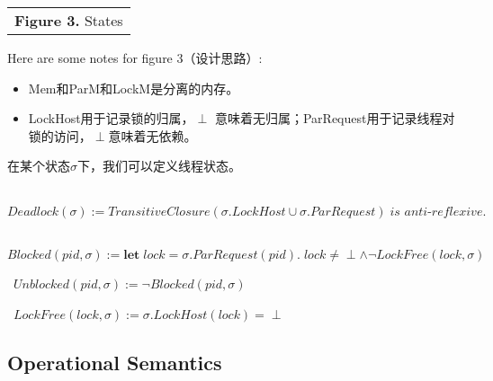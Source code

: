 \documentclass[UTF8, 8pt, a4paper ]{ctexart}
\begin{document}
\begin{small}
\begin{longtable}{rcl}
			\hline
			
			\multicolumn{3}{c}{\textbf{Figure 3.} States} 
		\end{longtable}

		Here are some notes for {figure 3}（设计思路）:
		\begin{itemize}
			\item Mem和ParM和LockM是分离的内存。
			\item LockHost用于记录锁的归属，$\perp$ 意味着无归属；ParRequest用于记录线程对锁的访问，$\perp$意味着无依赖。
		\end{itemize}
	

		在某个状态$\sigma$下，我们可以定义线程状态。

		\begin{definition}\ $Deadlock(\sigma):= TransitiveClosure(\sigma.LockHost \cup \sigma.ParRequest)\;\textit{is anti-reflexive}.$	
		\end{definition}

		\begin{definition}\ $Blocked(pid, \sigma):= \textbf{let}\;lock=\sigma.ParRequest(pid).\;lock \not= \perp \wedge \neg LockFree(lock, \sigma)$				
		\end{definition}


		\begin{definition}\ $Unblocked(pid, \sigma):= \neg Blocked(pid, \sigma)$	
			
		\end{definition}

			

		\begin{definition}\ $LockFree(lock, \sigma):= \sigma.LockHost(lock) = \perp$	
			
		\end{definition}


	\kspace
	
	\subsection{Operational Semantics}
	
	
	
	
	\begin{comment}
	$ \textsf{stop-faultyClt}(\sigma, t) \ \triangleq\ \left\{
	\begin{array}{ll}
		(t, \texttt{stop}) & \sigma(\textit{faulty}) = \textbf{true} \land  \sigma_o(\textit{role}) = \texttt{client}\\
		\tau & \textit{o.w.} \\
	\end{array}
	\right. $
	\end{comment}

\end{small}
\end{document}
